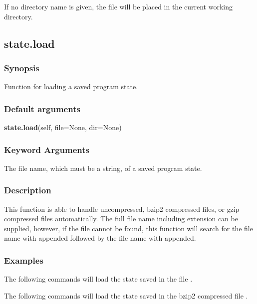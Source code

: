 If no directory name is given, the file will be placed in the current working directory.


\newpage

\subsection{state.load}


\subsubsection{Synopsis}

Function for loading a saved program state.

\subsubsection{Default arguments}

\textsf{\textbf{state.load}(self, file=None, dir=None)}


\subsubsection{Keyword Arguments}

  The file name, which must be a string, of a saved program state.


\subsubsection{Description}

This function is able to handle uncompressed, bzip2 compressed files, or gzip compressed
files automatically.  The full file name including extension can be supplied, however, if
the file cannot be found, this function will search for the file name with 
 appended
followed by the file name with 
 appended.


\subsubsection{Examples}

The following commands will load the state saved in the file 
.





The following commands will load the state saved in the bzip2 compressed file 
.

